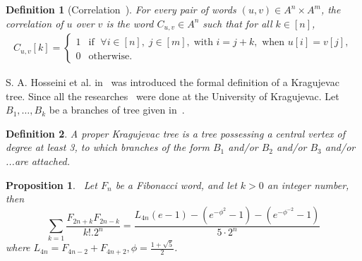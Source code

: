 \documentclass[12pt, a4paper]{article}
\newtheorem{proposition}{Proposition}[section]
\newtheorem{definition}{Definition}
\begin{document}
\begin{definition}[Correlation~\cite{Rampersad2023Wiebe}]
    For every pair of words $(u,v)\in A^n\times A^m$, the correlation of $u$ over $v$ is the word $C_{u,v}\in A^n$ such that for all $k\in [n]$, 
    \begin{align*} 
    C_{u,v}[k] =
    \begin{cases} 
        1 & \text{if }\; \forall i\in[n],\; j\in[m],\; \text{with } i = j + k, \text{ when } u[i] = v[j], \\
        0 & \text{otherwise.}
    \end{cases}
\end{align*}
\end{definition}
S. A. Hosseini et al. in~\cite{HosseiniGutmanAhmadi} was introduced the formal definition of a Kragujevac tree. Since all the researches~\cite{Furtula22Gutman,Furtula24Gutman,Furtula26Gutman} were done at the University of Kragujevac. Let $B_1,\dots,B_k$ be a branches of tree given in~\cite{HosseiniGutmanAhmadi}.
\begin{definition}
A proper Kragujevac tree is a tree possessing a central vertex of degree at least 3, to which branches of the form $B_1$ and/or $B_2$ and/or $B_3$ and/or ...are attached. 
\end{definition}
\begin{proposition}~\label{proex1}
Let $F_n$ be a Fibonacci word, and let $k>0$ an integer number, then
\[
\sum_{k=1}\frac{F_{2n+k}F_{2n-k}}{k!.2^n}=\dfrac{L_{4n} (e - 1) - (e^{-\phi^2} - 1) - (e^{-\phi^{-2}} - 1)}{5 \cdot 2^n}
\]
where $L_{4n} = F_{4n-2} + F_{4n+2},\phi = \frac{1 + \sqrt{5}}{2}$.
\end{proposition}
\end{document}
